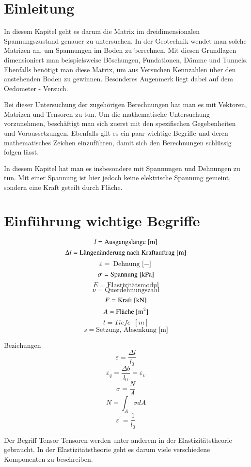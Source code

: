 \section{Einleitung\label{spannung:section:Einleitung}}
In diesem Kapitel geht es darum die Matrix im dreidimensionalen Spannungszustand genauer zu untersuchen.
In der Geotechnik wendet man solche Matrizen an, um Spannungen im Boden zu berechnen.
Mit diesen Grundlagen dimensioniert man beispielsweise Böschungen, Fundationen, Dämme und Tunnels.
Ebenfalls benötigt man diese Matrix, um aus Versuchen Kennzahlen über den anstehenden Boden zu gewinnen.
Besonderes Augenmerk liegt dabei auf dem Oedometer - Versuch.

Bei dieser Untersuchung der zugehörigen Berechnungen hat man es mit Vektoren, Matrizen und Tensoren zu tun.
Um die mathematische Untersuchung vorzunehmen, beschäftigt man sich zuerst mit den spezifischen Gegebenheiten und Voraussetzungen.
Ebenfalls gilt es ein paar wichtige Begriffe und deren mathematisches Zeichen einzuführen,
damit sich den Berechnungen schlüssig folgen lässt.

In diesem Kapitel hat man es insbesondere mit Spannungen und Dehnungen zu tun.
Mit einer Spannung ist hier jedoch keine elektrische Spannung gemeint,
sondern eine Kraft geteilt durch Fläche.

\section{Einführung wichtige Begriffe\label{spannung:section:Wichtige Begriffe}}
\[
l
=
\text{Ausgangslänge [\si{\meter}]}
\]
\[
\Delta l
=
\text{Längenänderung nach Kraftauftrag [\si{\meter}]}
\]
\[
\varepsilon
=
\text{Dehnung [$-$]}
\]
\[
\sigma
=
\text{Spannung [\si{\kilo\pascal}]}
\]
\[
E
=
\text{Elastizitätsmodul}
\]
\[
\nu
=
\text{Querdehnungszahl}
\]
\[
F
=
\text{Kraft [\si{\kilo\newton}]}
\]
\[
A
=
\text{Fläche [\si{\meter\squared}]}
\]
\[
t
=
Tiefe\enspace[m]
\]
\[
s
=
\text{Setzung, Absenkung [m]}
\]

Beziehungen
\[
\varepsilon
=
\frac{\Delta l}{l_0}
\]
\[
\varepsilon_q
=
\frac{\Delta b}{l_0}
=
\varepsilon_\upsilon
\]
\[
\sigma
=
\frac{N}{A}
\]
\[
N
=
\int_{A} \sigma dA
\]
\[
\varepsilon^{\prime}
=
\frac{1}{l_0}\]

Der Begriff Tensor
Tensoren werden unter anderem in der Elastizitätstheorie gebraucht.
In der Elastizitätstheorie geht es darum viele verschiedene Komponenten zu beschreiben.



